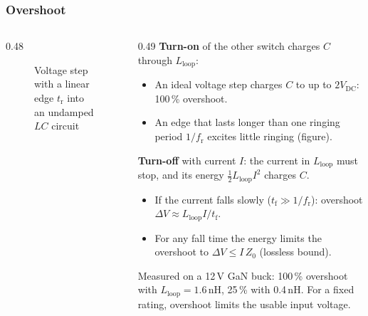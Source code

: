 \begin{frame}
	\frametitle{Overshoot}
	\begin{columns}[T]
		\begin{column}{0.48\textwidth}
			\begin{figure}
				\centering
				\caption{Voltage step with a linear edge $t_\mathrm{r}$ into an undamped $LC$ circuit}
			\end{figure}
		\end{column}
		\begin{column}{0.49\textwidth}
			\footnotesize
			\textbf{Turn-on} of the other switch charges $C$ through $L_\mathrm{loop}$:
			\begin{itemize}
				\item An ideal voltage step charges $C$ to up to $2V_\mathrm{DC}$: 100\,\% overshoot.
				\item An edge that lasts longer than one ringing period $1/f_\mathrm{r}$ excites little ringing (figure).
			\end{itemize}
			\textbf{Turn-off} with current $I$: the current in $L_\mathrm{loop}$ must stop, and its energy $\frac12L_\mathrm{loop}I^2$ charges $C$.
			\begin{itemize}
				\item If the current falls slowly ($t_\mathrm{f}\gg1/f_\mathrm{r}$): overshoot $\Delta V\approx L_\mathrm{loop}I/t_\mathrm{f}$.
				\item For any fall time the energy limits the overshoot to $\Delta V\leq I\,Z_0$ (lossless bound).
			\end{itemize}
			Measured on a 12\,V GaN buck: 100\,\% overshoot with $L_\mathrm{loop}=1.6$\,nH, 25\,\% with 0.4\,nH. For a fixed rating, overshoot limits the usable input voltage.
		\end{column}
	\end{columns}
\end{frame}

